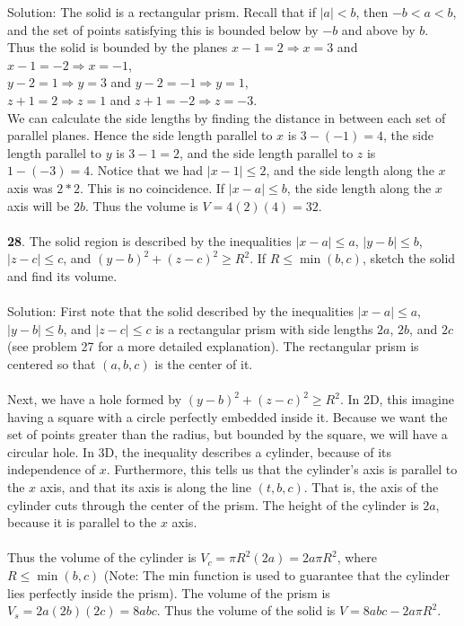 \documentclass[12pt]{amsbook}
\begin{document}
{\sc Solution}: The solid is a rectangular prism. Recall that if $|a|<b$, then $-b<a<b$, and the set of points satisfying this is bounded below by $-b$ and above by $b$. Thus the solid is bounded by the planes $x-1=2 \Rightarrow x=3$ and $x-1=-2 \Rightarrow x=-1$, \\ $y-2=1 \Rightarrow y=3$ and $y-2=-1 \Rightarrow y=1$,
\\ $z+1=2 \Rightarrow z=1$ and $z+1=-2 \Rightarrow z=-3$. 
\\
We can calculate the side lengths by finding the distance in between each set of parallel planes. Hence the side length parallel to $x$ is $3-(-1)=4$, the side length parallel to $y$ is $3-1=2$, and the side length parallel to $z$ is $1-(-3)=4$. Notice that we had $|x-1| \leq 2$, and the side length along the $x$ axis was $2*2$. This is no coincidence. If $|x-a| \leq b$, the side length along the $x$ axis will be $2b$. Thus the volume is $V=4(2)(4)=32$.
\\
\\
{\small\bf 28}. The solid region is described by 
the inequalities $|x-a|\leq a$, $|y-b|\leq b$, 
$|z-c|\leq c$, and $(y-b)^2+(z-c)^2\geq R^2$.
If $R\leq\min(b,c)$, sketch the solid and find its volume.
\\
\\
{\sc Solution}: First note that the solid described by the inequalities $|x-a|\leq a$, $|y-b|\leq b$, and 
$|z-c|\leq c$ is a rectangular prism with side lengths $2a$, $2b$, and $2c$ (see problem 27 for a more detailed explanation). The rectangular prism is centered so that $(a,b,c)$ is the center of it. 
\\
\\
Next, we have a hole formed by $(y-b)^2+(z-c)^2\geq R^2$. In 2D, this imagine having a square with a circle perfectly embedded inside it. Because we want the set of points greater than the radius, but bounded by the square, we will have a circular hole. In 3D, the inequality describes a cylinder, because of its independence of $x$. Furthermore, this tells us that the cylinder's axis is parallel to the $x$ axis, and that its axis is along the line $(t,b,c)$.   That is, the axis of the cylinder cuts through the center of the prism. The height of the cylinder is $2a$, because it is parallel to the $x$ axis. 
\\
\\
Thus the volume of the cylinder is $V_c=\pi R^2(2a)=2a\pi R^2$, where $R\leq \min(b,c)$ (Note: The min function is used to guarantee that the cylinder lies perfectly inside the prism). The volume of the prism is $V_s=2a(2b)(2c)=8abc$. Thus the volume of the solid is $V=8abc-2a\pi R^2$. 
\end{document}

